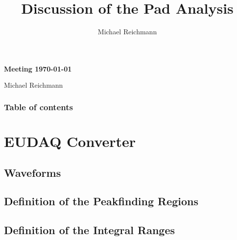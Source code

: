 \documentclass[9pt]{beamer}
\title[Analysis]{Discussion of the Pad Analysis}
\author[M. Reichmann]{Michael Reichmann}
\institute[\textbf{\textit{ETH}}\scalebox{.6}{\textit{Z\"{u}rich}}]{Swiss Federal Institute of Technology Zurich}
\begin{document}
\begin{frame}
	\begin{center}
	\end{center}
	\begin{alertblock}{
		\begin{center}
			\textbf{Meeting \today}
		\end{center}}
		\vspace*{10pt}
		\begin{center}\small
		Michael Reichmann
		\end{center}\normalsize
	\end{alertblock}
\end{frame}
\begin{frame}[allowframebreaks]
	\frametitle{Table of contents}
	\tableofcontents[pausesections]
\end{frame}
\section{EUDAQ Converter}
\subsection{Waveforms}
\begin{frame}
\end{frame}
\subsection{Definition of the Peakfinding Regions}
\begin{frame}
\end{frame}
\subsection{Definition of the Integral Ranges}
\begin{frame}
\end{frame}
\end{document}
